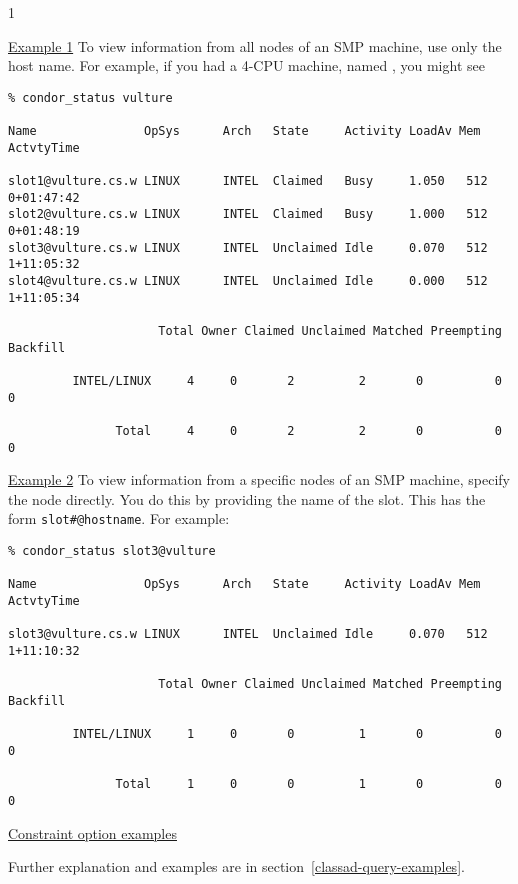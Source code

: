 \begin{ManPage}{\label{man-condor-status}}{1}
\begin{itemize}
\end{itemize}

\Examples

\underline{Example 1} To view information from all nodes of an SMP
machine, use only the host name.
For example, if you had a 4-CPU machine, named
, you might see
\footnotesize
\begin{verbatim}
% condor_status vulture

Name               OpSys      Arch   State     Activity LoadAv Mem   ActvtyTime

slot1@vulture.cs.w LINUX      INTEL  Claimed   Busy     1.050   512  0+01:47:42
slot2@vulture.cs.w LINUX      INTEL  Claimed   Busy     1.000   512  0+01:48:19
slot3@vulture.cs.w LINUX      INTEL  Unclaimed Idle     0.070   512  1+11:05:32
slot4@vulture.cs.w LINUX      INTEL  Unclaimed Idle     0.000   512  1+11:05:34

                     Total Owner Claimed Unclaimed Matched Preempting Backfill

         INTEL/LINUX     4     0       2         2       0          0        0

               Total     4     0       2         2       0          0        0
\end{verbatim}
\normalsize


\underline{Example 2} To view information from a specific nodes of an
SMP machine, specify the node directly.
You do this by providing the name of the slot.
This has the form \texttt{slot\#@hostname}.
For example:
\footnotesize
\begin{verbatim}
% condor_status slot3@vulture

Name               OpSys      Arch   State     Activity LoadAv Mem   ActvtyTime

slot3@vulture.cs.w LINUX      INTEL  Unclaimed Idle     0.070   512  1+11:10:32

                     Total Owner Claimed Unclaimed Matched Preempting Backfill

         INTEL/LINUX     1     0       0         1       0          0        0

               Total     1     0       0         1       0          0        0
\end{verbatim}
\normalsize

\underline{Constraint option examples}

Further explanation and examples are in section~\ref{classad-query-examples}.


\end{ManPage}
